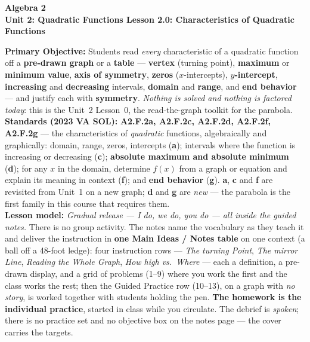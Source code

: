 \documentclass[10pt]{article}
\newcommand{\CourseName}{Algebra 2}
\newcommand{\UnitNumberName}{Unit 2: Quadratic Functions \quad}
\newcommand{\LessonNumberName}{Lesson 2.0: Characteristics of Quadratic Functions}
\begin{document}
\begin{center}
    {\Large\bfseries \CourseName \\
    {\small\bfseries \UnitNumberName \LessonNumberName}}
\end{center}

\begin{tcolorbox}[colback=forestbg, colframe=forest, boxrule=0.9pt, arc=2mm,
    left=2mm, right=2mm, top=1.5mm, bottom=1.5mm]
    \textbf{Primary Objective:} Students read \emph{every} characteristic of a quadratic function
    off a \textbf{pre-drawn graph} or a \textbf{table} --- \textbf{vertex} (turning point),
    \textbf{maximum} or \textbf{minimum value}, \textbf{axis of symmetry}, \textbf{zeros}
    ($x$-intercepts), \textbf{$y$-intercept}, \textbf{increasing} and \textbf{decreasing}
    intervals, \textbf{domain} and \textbf{range}, and \textbf{end behavior} --- and justify each
    with \textbf{symmetry}. \emph{Nothing is solved and nothing is factored today}: this is the
    Unit~2 Lesson~0, the read-the-graph toolkit for the parabola.
    \\[2pt]
    \textbf{Standards (2023 VA SOL):} \textbf{A2.F.2a, A2.F.2c, A2.F.2d, A2.F.2f, A2.F.2g} ---
    the characteristics of \emph{quadratic} functions, algebraically and graphically: domain,
    range, zeros, intercepts (\textbf{a}); intervals where the function is increasing or
    decreasing (\textbf{c}); \textbf{absolute maximum and absolute minimum} (\textbf{d}); for any
    $x$ in the domain, determine $f(x)$ from a graph or equation and explain its meaning in
    context (\textbf{f}); and \textbf{end behavior} (\textbf{g}). \textbf{a}, \textbf{c} and
    \textbf{f} are revisited from Unit~1 on a new graph; \textbf{d} and \textbf{g} are
    \emph{new} --- the parabola is the first family in this course that requires them.
    \\[2pt]
    \textbf{Lesson model:} \emph{Gradual release --- I do, we do, you do --- all inside the guided
    notes.} There is no group activity. The notes name the vocabulary as they teach it and deliver
    the instruction in \textbf{one Main Ideas / Notes table} on one context (a ball off a 48-foot
    ledge): four instruction rows --- \emph{The turning Point}, \emph{The mirror Line},
    \emph{Reading the Whole Graph}, \emph{How high vs.\ Where} --- each a definition, a pre-drawn
    display, and a grid of problems (1--9) where you work the first and the class works the rest;
    then the Guided Practice row (10--13), on a graph with \emph{no story}, is worked together
    with students holding the pen. \textbf{The homework is the individual practice}, started in
    class while you circulate. The debrief is \emph{spoken}; there is no practice set and no
    objective box on the notes page --- the cover carries the targets.
\end{tcolorbox}
\end{document}
